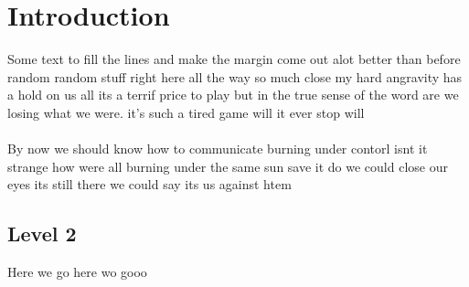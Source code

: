 \chapter{Introduction}
\label{chap:intro}


Some text to fill the lines and make the margin come out alot better than before random random stuff right here all the way so much close my hard angravity has a hold on us all its a terrif price to play but in the true sense of the word are we losing what we were. it's such a tired game will it ever stop will \\\\
By now we should know how to communicate burning under contorl isnt it strange how were all burning under the same sun save it do we could close our eyes its still there we could say its us against htem

\section{Level 2}
Here we go  here wo gooo